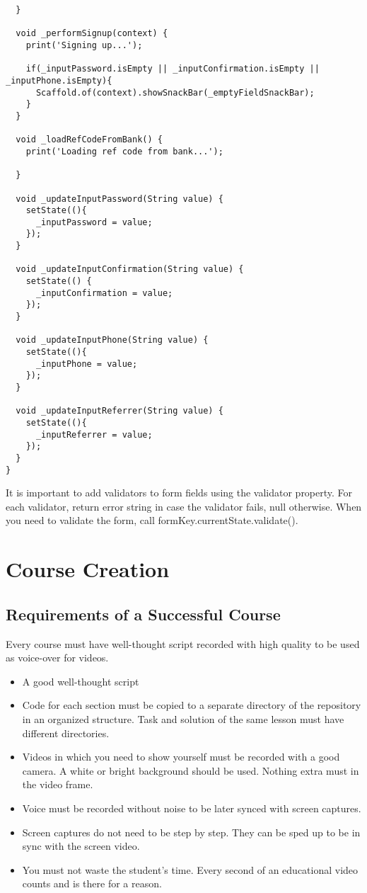\documentclass{article}
\begin{document}
\begin{lstlisting}
  }

  void _performSignup(context) {
    print('Signing up...');

    if(_inputPassword.isEmpty || _inputConfirmation.isEmpty || _inputPhone.isEmpty){
      Scaffold.of(context).showSnackBar(_emptyFieldSnackBar);
    }
  }

  void _loadRefCodeFromBank() {
    print('Loading ref code from bank...');

  }

  void _updateInputPassword(String value) {
    setState((){
      _inputPassword = value;
    });
  }

  void _updateInputConfirmation(String value) {
    setState(() {
      _inputConfirmation = value;
    });
  }

  void _updateInputPhone(String value) {
    setState((){
      _inputPhone = value;
    });
  }

  void _updateInputReferrer(String value) {
    setState((){
      _inputReferrer = value;
    });
  }
}
\end{lstlisting}
It is important to add validators to form fields using the validator property. For each validator, return error string in case the validator fails, null otherwise. 
When you need to validate the form, call formKey.currentState.validate(). 

\section{Course Creation}
\subsection{Requirements of a Successful Course}
Every course must have well-thought script recorded with high quality to be used as voice-over for videos. 
\begin{itemize}
\item A good well-thought script
\item Code for each section must be copied to a separate directory of the repository in an organized structure. Task and solution of the same lesson must have different directories. 
\item Videos in which you need to show yourself must be recorded with a good camera. A white or bright background should be used. Nothing extra must in the video frame. 
\item Voice must be recorded without noise to be later synced with screen captures. 
\item Screen captures do not need to be step by step. They can be sped up to be in sync with the screen video. 
\item You must not waste the student's time. Every second of an educational video counts and is there for a reason. 


\end{itemize}
\end{document}
